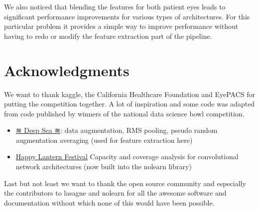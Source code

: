 \documentclass[12pt,a4paper]{scrartcl}
\begin{document}
We also noticed that blending the features for both patient eyes leads to significant performance improvements for various types of architectures. For this particular problem it provides a simple way to improve performance without having to redo or modify the feature extraction part of the pipeline.
\section{Acknowledgments}
We want to thank kaggle, the California Healthcare Foundation and EyePACS for putting the competition together.
A lot of inspiration and some code was adapted from code published by winners of the national data science bowl competition. 
\begin{itemize}
\item \href{https://github.com/benanne/kaggle-ndsb}{≋ Deep Sea ≋}: data augmentation, RMS pooling, pseudo random augmentation averaging (used for feature extraction here)
\item \href{https://www.kaggle.com/c/datasciencebowl/forums/t/13166/happy-lantern-festival-report-and-code}{Happy Lantern Festival} Capacity and coverage analysis for convolutional network architectures (now built into the nolearn library)
\end{itemize}
Last but not least we want to thank the open source community and especially the contributors to lasagne and nolearn for all the awesome software and documentation without which none of this would have been possible.
\end{document}

